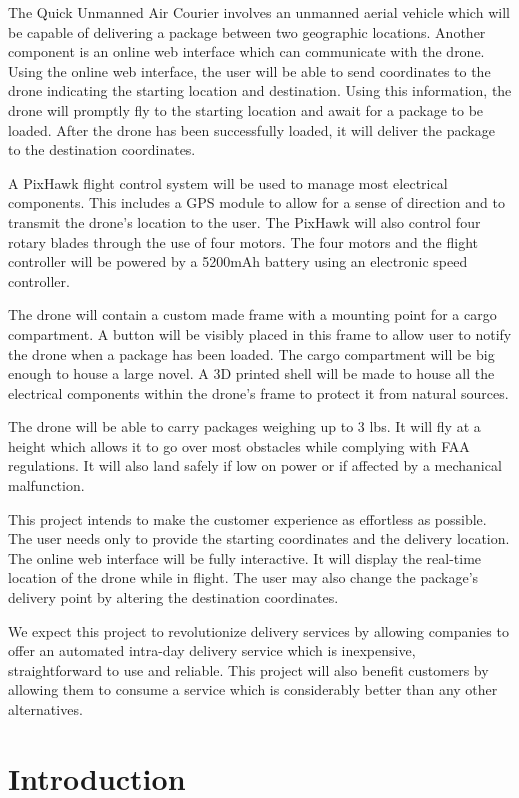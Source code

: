 \documentclass[12pt]{extarticle}
\begin{document}
The Quick Unmanned Air Courier involves an unmanned aerial vehicle which will be capable of delivering a package between two geographic locations. Another component is an online web interface which can communicate with the drone. Using the online web interface, the user will be able to send coordinates to the drone indicating the starting location and destination. Using this information, the drone will promptly fly to the starting location and await for a package to be loaded. After the drone has been successfully loaded, it will deliver the package to the destination coordinates.

A PixHawk flight control system will be used to manage most electrical components. This includes a GPS module to allow for a sense of direction and to transmit the drone’s location to the user. The PixHawk will also control four rotary blades through the use of four motors. The four motors and the flight controller will be powered by a 5200mAh battery using an electronic speed controller.

The drone will contain a custom made frame with a mounting point for a cargo compartment. A button will be visibly placed in this frame to allow user to notify the drone when a package has been loaded. The cargo compartment will be big enough to house a large novel. A 3D printed shell will be made to house all the electrical components within the drone’s frame to protect it from natural sources.

The drone will be able to carry packages weighing up to 3 lbs. It will fly at a height which allows it to go over most obstacles while complying with FAA regulations. It will also land safely if low on power or if affected by a mechanical malfunction.

This project intends to make the customer experience as effortless as possible. The user needs only to provide the starting coordinates and the delivery location. The online web interface will be fully interactive. It will display the real-time location of the drone while in flight. The user may also change the package’s delivery point by altering the destination coordinates.

We expect this project to revolutionize delivery services by allowing companies to offer an automated intra-day delivery service which is inexpensive, straightforward to use and reliable. This project will also benefit customers by allowing them to consume a service which is considerably better than any other alternatives.

\section{Introduction}
\end{document}
